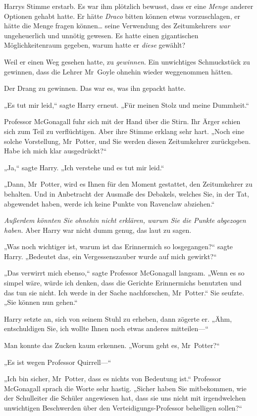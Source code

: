 {Harrys Stimme erstarb. Es war ihm plötzlich bewusst, dass er eine \emph{Menge} anderer Optionen gehabt hatte. Er hätte \emph{Draco} bitten können etwas vorzuschlagen, er hätte die Menge fragen können… seine Verwendung des Zeitumkehrers \emph{war} ungeheuerlich und unnötig gewesen. Es hatte einen gigantischen Möglichkeitenraum gegeben, warum hatte er \emph{diese} gewählt?

Weil er einen Weg gesehen hatte, zu \emph{gewinnen}. Ein unwichtiges Schmuckstück zu gewinnen, dass die Lehrer Mr~Goyle ohnehin wieder weggenommen hätten.

Der Drang zu gewinnen. Das war es, was ihn gepackt hatte.

„Es tut mir leid,“ sagte Harry erneut. „Für meinen Stolz und meine Dummheit.“

Professor McGonagall fuhr sich mit der Hand über die Stirn. Ihr Ärger schien sich zum Teil zu verflüchtigen. Aber ihre Stimme erklang sehr hart. „Noch eine solche Vorstellung, Mr~Potter, und Sie werden diesen Zeitumkehrer zurückgeben. Habe ich mich klar ausgedrückt?“

„Ja,“ sagte Harry. „Ich verstehe und es tut mir leid.“

„Dann, Mr~Potter, wird es Ihnen für den Moment gestattet, den Zeitumkehrer zu behalten. Und in Anbetracht der Ausmaße des Debakels, welches Sie, in der Tat, abgewendet haben, werde ich keine Punkte von Ravenclaw abziehen.“

\emph{Außerdem könnten Sie ohnehin nicht erklären, warum Sie die Punkte} \emph{abgezogen haben.} Aber Harry war nicht dumm genug, das laut zu sagen.

„Was noch wichtiger ist, warum ist das Erinnermich so losgegangen?“ sagte Harry. „Bedeutet das, ein Vergessenszauber wurde auf mich gewirkt?“

„Das verwirrt mich ebenso,“ sagte Professor McGonagall langsam. „Wenn es so simpel wäre, würde ich denken, dass die Gerichte Erinnermichs benutzten und das tun sie nicht. Ich werde in der Sache nachforschen, Mr~Potter.“ Sie seufzte. „Sie können nun gehen.“

Harry setzte an, sich von seinem Stuhl zu erheben, dann zögerte er. „Ähm, entschuldigen Sie, ich wollte Ihnen noch etwas anderes mitteilen—“

Man konnte das Zucken kaum erkennen. „Worum geht es, Mr~Potter?“

„Es ist wegen Professor Quirrell—“

„Ich bin sicher, Mr~Potter, dass es nichts von Bedeutung ist.“ Professor McGonagall sprach die Worte sehr hastig. „Sicher haben Sie mitbekommen, wie der Schulleiter die Schüler angewiesen hat, dass sie uns nicht mit irgendwelchen unwichtigen Beschwerden über den Verteidigungs-Professor behelligen sollen?“

}
